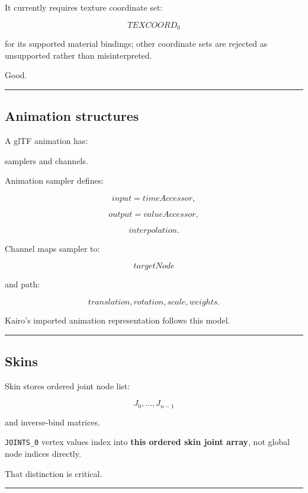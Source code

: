 It currently requires texture coordinate set:

\[
TEXCOORD_0
\]

for its supported material bindings; other coordinate sets are rejected as unsupported rather than misinterpreted.

Good.

\begin{center}\rule{0.5\linewidth}{0.5pt}\end{center}

\subsection{Animation structures}\label{04-visual-computing-ii-ch041-animation-structures}

A glTF animation has:

samplers and channels.

Animation sampler defines:

\[
input=timeAccessor,
\]

\[
output=valueAccessor,
\]

\[
interpolation.
\]

Channel maps sampler to:

\[
targetNode
\]

and path:

\[
translation,
rotation,
scale,
weights.
\]

Kairo's imported animation representation follows this model.

\begin{center}\rule{0.5\linewidth}{0.5pt}\end{center}

\subsection{Skins}\label{04-visual-computing-ii-ch041-skins}

Skin stores ordered joint node list:

\[
J_0,\dots,J_{n-1}
\]

and inverse-bind matrices.

\texttt{JOINTS\_0} vertex values index into \textbf{this ordered skin joint array}, not global node indices directly.

That distinction is critical.

\begin{center}\rule{0.5\linewidth}{0.5pt}\end{center}

